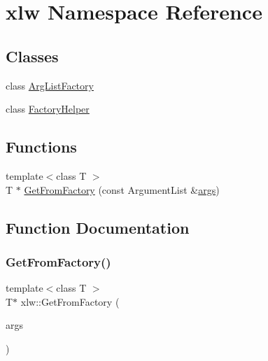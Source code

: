 \hypertarget{namespacexlw}{}\section{xlw Namespace Reference}
\label{namespacexlw}
\subsection*{Classes}
\begin{DoxyCompactItemize}
\item 
class \hyperlink{classxlw_1_1ArgListFactory}{Arg\+List\+Factory}
\item 
class \hyperlink{classxlw_1_1FactoryHelper}{Factory\+Helper}
\end{DoxyCompactItemize}
\subsection*{Functions}
\begin{DoxyCompactItemize}
\item 
{\footnotesize template$<$class T $>$ }\\T $\ast$ \hyperlink{namespacexlw_a2df0ea1334a20f9bf29c8b2a0b32e337}{Get\+From\+Factory} (const Argument\+List \&\hyperlink{path__generation_8h_a75c13cde2074f502cc4348c70528572d}{args})
\end{DoxyCompactItemize}


\subsection{Function Documentation}
\hypertarget{namespacexlw_a2df0ea1334a20f9bf29c8b2a0b32e337}{}\label{namespacexlw_a2df0ea1334a20f9bf29c8b2a0b32e337} 
\subsubsection{\texorpdfstring{Get\+From\+Factory()}{GetFromFactory()}}
{\footnotesize\ttfamily template$<$class T $>$ \\
T$\ast$ xlw\+::\+Get\+From\+Factory (\begin{DoxyParamCaption}\item[{const Argument\+List \&}]{args }\end{DoxyParamCaption})}

